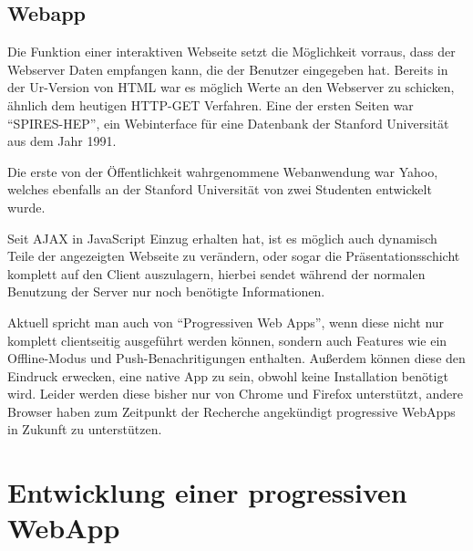 \documentclass[a4paper,12pt,ngerman]{scrartcl}      %
\let\oldcite\cite
\renewcommand{\cite}[1]{\textsuperscript{\oldcite{#1}}}
\begin{document}
	\subsection{Webapp}
	Die Funktion einer interaktiven Webseite setzt die Möglichkeit vorraus, dass der Webserver Daten empfangen kann, die der Benutzer eingegeben hat. Bereits in der Ur-Version von HTML war es möglich Werte an den Webserver zu schicken, ähnlich dem heutigen HTTP-GET Verfahren. Eine der ersten Seiten war ``SPIRES-HEP'', ein Webinterface für eine Datenbank der Stanford Universität aus dem Jahr 1991.\par
	Die erste von der Öffentlichkeit wahrgenommene Webanwendung war Yahoo, welches ebenfalls an der Stanford Universität von zwei Studenten entwickelt wurde.\par
	Seit AJAX in JavaScript Einzug erhalten hat, ist es möglich auch dynamisch Teile der angezeigten Webseite zu verändern, oder sogar die Präsentationsschicht komplett auf den Client auszulagern, hierbei sendet während der normalen Benutzung der Server nur noch benötigte Informationen.\cite{webappWiki}\par
	Aktuell spricht man auch von ``Progressiven Web Apps'', wenn diese nicht nur komplett clientseitig ausgeführt werden können, sondern auch Features wie ein Offline-Modus und Push-Benachritigungen enthalten. Außerdem können diese den Eindruck erwecken, eine native App zu sein, obwohl keine Installation benötigt wird. Leider werden diese bisher nur von Chrome und Firefox unterstützt, andere Browser haben zum Zeitpunkt der Recherche angekündigt progressive WebApps in Zukunft zu unterstützen.\cite{prwebappWiki}\par
	
	\newpage
	\section{Entwicklung einer progressiven WebApp}
\end{document}

